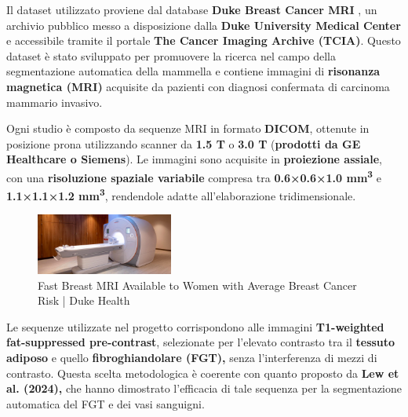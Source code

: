 

Il dataset utilizzato proviene dal database \textbf{Duke Breast Cancer MRI} \cite{duke_breast_mri}, un archivio pubblico messo a disposizione dalla \textbf{Duke University Medical Center} e accessibile tramite il portale \textbf{The Cancer Imaging Archive (TCIA)}. Questo dataset è stato sviluppato per promuovere la ricerca nel campo della segmentazione automatica della mammella e contiene immagini di \textbf{risonanza magnetica (MRI)} acquisite da pazienti con diagnosi confermata di carcinoma mammario invasivo.

Ogni studio è composto da sequenze MRI in formato \textbf{DICOM}, ottenute in posizione prona utilizzando scanner da \textbf{1.5 T} o \textbf{3.0 T} (\textbf{prodotti da GE Healthcare o Siemens}). Le immagini sono acquisite in \textbf{proiezione assiale}, con una \textbf{risoluzione spaziale variabile} compresa tra \textbf{0.6×0.6×1.0 mm\textsuperscript{3}} e \textbf{1.1×1.1×1.2 mm\textsuperscript{3}}, rendendole adatte all'elaborazione tridimensionale.

\begin{figure} 
  	\centering 
 	\includegraphics[width=0.4\textwidth]{images/2025-08-09-19-34-01.png} 
    \caption{Fast Breast MRI Available to Women with Average Breast Cancer Risk | Duke Health \cite{mri_machine}}
 \end{figure} 


Le sequenze utilizzate nel progetto corrispondono alle immagini \textbf{T1-weighted fat-suppressed pre-contrast}, selezionate per l’elevato contrasto tra il \textbf{tessuto adiposo} e quello \textbf{fibroghiandolare (FGT),} senza l’interferenza di mezzi di contrasto. Questa scelta metodologica è coerente con quanto proposto da \textbf{Lew et al. (2024),} che hanno dimostrato l’efficacia di tale sequenza per la segmentazione automatica del FGT e dei vasi sanguigni.

